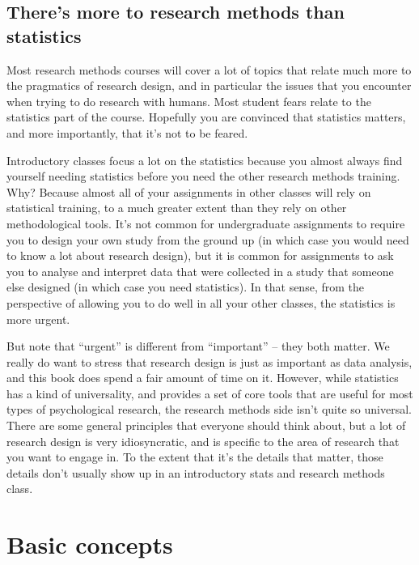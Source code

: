 \documentclass[
  11pt,
]{book}
\theoremstyle{definition}
\theoremstyle{definition}
\theoremstyle{definition}
\theoremstyle{definition}
\theoremstyle{remark}
\begin{document}
\hypertarget{theres-more-to-research-methods-than-statistics}{%
\section{There's more to research methods than statistics}\label{theres-more-to-research-methods-than-statistics}}

Most research methods courses will cover a lot of topics that relate much more to the pragmatics of research design, and in particular the issues that you encounter when trying to do research with humans. Most student fears relate to the statistics part of the course. Hopefully you are convinced that statistics matters, and more importantly, that it's not to be feared.

Introductory classes focus a lot on the statistics because you almost always find yourself needing statistics before you need the other research methods training. Why? Because almost all of your assignments in other classes will rely on statistical training, to a much greater extent than they rely on other methodological tools. It's not common for undergraduate assignments to require you to design your own study from the ground up (in which case you would need to know a lot about research design), but it is common for assignments to ask you to analyse and interpret data that were collected in a study that someone else designed (in which case you need statistics). In that sense, from the perspective of allowing you to do well in all your other classes, the statistics is more urgent.

But note that ``urgent'' is different from ``important'' -- they both matter. We really do want to stress that research design is just as important as data analysis, and this book does spend a fair amount of time on it. However, while statistics has a kind of universality, and provides a set of core tools that are useful for most types of psychological research, the research methods side isn't quite so universal. There are some general principles that everyone should think about, but a lot of research design is very idiosyncratic, and is specific to the area of research that you want to engage in. To the extent that it's the details that matter, those details don't usually show up in an introductory stats and research methods class.

\hypertarget{researchdesign}{%
\chapter{Basic concepts}\label{researchdesign}}
\end{document}
